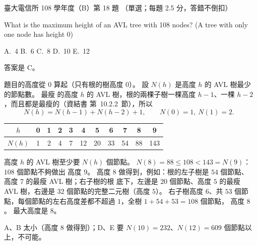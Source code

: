 \begin{pastexam}[label={px:ntu-108-comm-dsab-18}]{臺大電信所 108 學年度（B）第 18 題}
（單選；每題 2.5 分，答錯不倒扣）

What is the maximum height of an AVL tree with 108 nodes? (A tree with only one node has height 0)

A.~4 \qquad B.~6 \qquad C.~8 \qquad D.~10 \qquad E.~12
\end{pastexam}

\begin{pastsoln}
答案是 C。

題目的高度從 $0$ 算起（只有根的樹高度 $0$）。 設 $N(h)$ 是高度 $h$ 的 AVL 樹最少的節點數。 最瘦
的高度 $h$ 的 AVL 樹，根的兩棵子樹一棵高度 $h - 1$、一棵 $h - 2$，而且都是最瘦的（資結書
第~10.2.2~節），所以
\[
N(h) = N(h - 1) + N(h - 2) + 1, \qquad N(0) = 1,\ N(1) = 2.
\]
\begin{center}
\begin{tabular}{c*{10}{c}}
\toprule
$h$ & 0 & 1 & 2 & 3 & 4 & 5 & 6 & 7 & 8 & 9 \\
\midrule
$N(h)$ & 1 & 2 & 4 & 7 & 12 & 20 & 33 & 54 & 88 & 143 \\
\bottomrule
\end{tabular}
\end{center}
高度 $h$ 的 AVL 樹至少要 $N(h)$ 個節點。 $N(8) = 88 \le 108 < 143 = N(9)$：$108$ 個節點不夠做出
高度 $9$。 高度 $8$ 做得到，例如：根的左子樹是 $54$ 個節點、高度 $7$ 的最瘦 AVL 樹；右子樹的根
底下，左邊是 $20$ 個節點、高度 $5$ 的最瘦 AVL 樹，右邊是 $32$ 個節點的完整二元樹（高度 $5$）。
右子樹高度 $6$、共 $53$ 個節點，每個節點的左右高度差都不超過 $1$，全樹 $1 + 54 + 53 = 108$ 個節點，
高度 $8$。 最大高度是 $8$。

A、B 太小（高度 $8$ 做得到）；D、E 要 $N(10) = 232$、$N(12) = 609$ 個節點以上，不可能。
\end{pastsoln}
